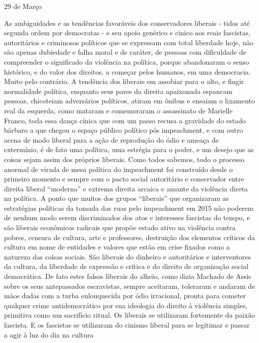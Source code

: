 29 de Março

As ambiguidades e as tendências favoráveis dos conservadores liberais -
tidos até segunda ordem por democratas - e seu apoio genérico e cinico
aos reais fascistas, autoritários e criminosos políticos que se
expressam com total liberdade hoje, não são apenas dubiedade e falha
moral e de caráter, de pessoas com dificuldade de compreender o
significado da violência na política, porque abandonaram o senso
histórico, e do valor dos direitos, a começar pelos humanos, em uma
democracia. Muito pelo contrário. A tendência dos liberais em assobiar
para o alto, e fingir normalidade política, enquanto seus pares da
direita apaixonada espancam pessoas, chicoteiam adversários políticos,
atiram em ônibus e ensaiam o lixamento real da esquerda, como mataram e
comemoraram o assassinato de Marielle Franco, toda essa dança cínica que
com um passo recusa a gravidade do estado bárbaro a que chegou o espaço
público político pós impeachment, e com outro acena de modo liberal para
a ação de reprodução do ódio e ameaça de extermínio, é de fato uma
política, uma estrégia para o poder, e um desejo que as coisas sejam
assim dos próprios liberais. Como todos sabemos, todo o processo anormal
de virada de mesa política do impeachment foi construído desde o
primeiro momento e sempre com o pacto social autoritário e conservador
entre direita liberal ``moderna'' e extrema direita arcaica e amante da
violência direta na política. A ponto que muitos dos grupos ``liberais''
que organizaram as estratégias políticas da tomada das ruas pelo
impeachment em 2015 não poderem de nenhum modo serem discriminados dos
atos e interesses fascistas do tempo, e são liberais econômicos radicais
que propõe estado ativo na violência contra pobres, censura de cultura,
arte e professores, destruição dos elementos críticos da cultura em nome
de entidades e valores que estão em crise fixados como a natureza das
coisas sociais. São liberais do dinheiro e autoritários e interventores
da cultura, da liberdade de expressão e crítica e do direito de
organização social democrática. De fato estes falsos liberais do alheio,
como dizia Machado de Assis sobre os seus antepassados escravistas,
sempre aceitaram, toleraram e andaram de mãos dadas com a turba
enlouquecida por ódio irracional, pronta para cometer qualquer crime
antidemocrático por sua ideologia do direito à violência simples,
primitiva como um sacrifício ritual. Os liberais se utilizaram
fortemente da paixão fascista. E os fascistas se utilizaram do cinismo
liberal para se legitimar e passar a agir à luz do dia na cultura
